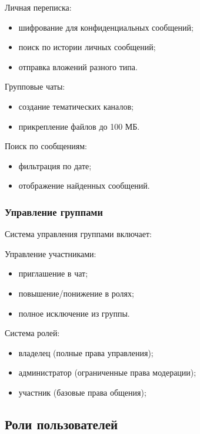 Личная переписка:

	\begin{itemize}
		\item шифрование для конфиденциальных сообщений;
		\item поиск по истории личных сообщений;
		\item отправка вложений разного типа.
	\end{itemize}
	
Групповые чаты:

	\begin{itemize}
		\item создание тематических каналов;
		\item прикрепление файлов до 100 МБ.
	\end{itemize}
	
Поиск по сообщениям:

	\begin{itemize}
		\item фильтрация по дате;
		\item отображение найденных сообщений.
	\end{itemize}
	
\subsubsection{Управление группами}

Система управления группами включает:
	
Управление участниками:

	\begin{itemize}
		\item приглашение в чат;
		\item повышение/понижение в ролях;
		\item полное исключение из группы.
	\end{itemize}
	
Система ролей:

	\begin{itemize}
		\item владелец (полные права управления);
		\item администратор (ограниченные права модерации);
		\item участник (базовые права общения);
	\end{itemize}
	

\subsection{Роли пользователей}

